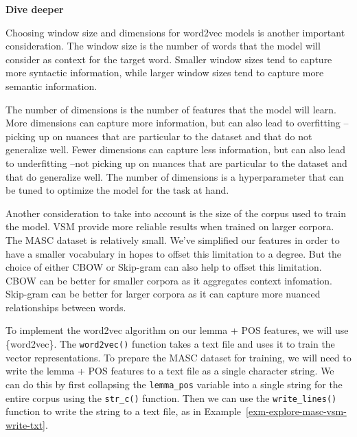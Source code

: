 \documentclass[
  letterpaper,
  krantz1]{latex/krantz-mod}
\theoremstyle{definition}
\theoremstyle{definition}
\theoremstyle{remark}
\begin{document}
\begin{tcolorbox}[enhanced jigsaw, leftrule=.75mm, colframe=quarto-callout-color-frame, left=2mm, colback=white, toprule=.15mm, breakable, arc=.35mm, opacityback=0, bottomrule=.15mm, rightrule=.15mm]

\textbf{ Dive deeper}

Choosing window size and dimensions for word2vec models is another
important consideration. The window size is the number of words that the
model will consider as context for the target word. Smaller window sizes
tend to capture more syntactic information, while larger window sizes
tend to capture more semantic information.

The number of dimensions is the number of features that the model will
learn. More dimensions can capture more information, but can also lead
to overfitting --picking up on nuances that are particular to the
dataset and that do not generalize well. Fewer dimensions can capture
less information, but can also lead to underfitting --not picking up on
nuances that are particular to the dataset and that do generalize well.
The number of dimensions is a hyperparameter that can be tuned to
optimize the model for the task at hand.

\end{tcolorbox}

Another consideration to take into account is the size of the corpus
used to train the model. VSM provide more reliable results when trained
on larger corpora. The MASC dataset is relatively small. We've
simplified our features in order to have a smaller vocabulary in hopes
to offset this limitation to a degree. But the choice of either CBOW or
Skip-gram can also help to offset this limitation. CBOW can be better
for smaller corpora as it aggregates context infomation. Skip-gram can
be better for larger corpora as it can capture more nuanced
relationships between words.

To implement the word2vec algorithm on our lemma + POS features, we will
use \{word2vec\}. The \texttt{word2vec()} function takes a text file and
uses it to train the vector representations. To prepare the MASC dataset
for training, we will need to write the lemma + POS features to a text
file as a single character string. We can do this by first collapsing
the \texttt{lemma\_pos} variable into a single string for the entire
corpus using the \texttt{str\_c()} function. Then we can use the
\texttt{write\_lines()} function to write the string to a text file, as
in Example~\ref{exm-explore-masc-vsm-write-txt}.
\end{document}
